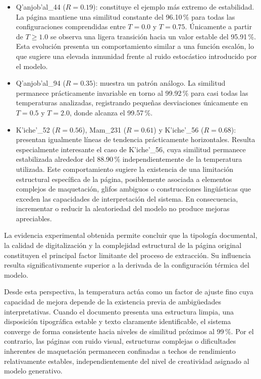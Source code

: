 \begin{itemize}
    \item Q'anjob'al\_44 (\(R = 0.19\)): constituye el ejemplo más extremo de estabilidad. La página mantiene una similitud constante del 96.10\,\% para todas las configuraciones comprendidas entre \(T=0.0\) y \(T=0.75\). Únicamente a partir de \(T \ge 1.0\) se observa una ligera transición hacia un valor estable del 95.91\,\%. Esta evolución presenta un comportamiento similar a una función escalón, lo que sugiere una elevada inmunidad frente al ruido estocástico introducido por el modelo.

    \item Q'anjob'al\_94 (\(R = 0.35\)): muestra un patrón análogo. La similitud permanece prácticamente invariable en torno al 99.92\,\% para casi todas las temperaturas analizadas, registrando pequeñas desviaciones únicamente en \(T=0.5\) y \(T=2.0\), donde alcanza el 99.57\,\%.

    \item K'iche'\_52 (\(R = 0.56\)), Mam\_231 (\(R = 0.61\)) y K'iche'\_56 (\(R = 0.68\)): presentan igualmente líneas de tendencia prácticamente horizontales. Resulta especialmente interesante el caso de K'iche'\_56, cuya similitud permanece estabilizada alrededor del 88.90\,\% independientemente de la temperatura utilizada. Este comportamiento sugiere la existencia de una limitación estructural específica de la página, posiblemente asociada a elementos complejos de maquetación, glifos ambiguos o construcciones lingüísticas que exceden las capacidades de interpretación del sistema. En consecuencia, incrementar o reducir la aleatoriedad del modelo no produce mejoras apreciables.
\end{itemize}

La evidencia experimental obtenida permite concluir que la tipología documental, la calidad de digitalización y la complejidad estructural de la página original constituyen el principal factor limitante del proceso de extracción. Su influencia resulta significativamente superior a la derivada de la configuración térmica del modelo.

Desde esta perspectiva, la temperatura actúa como un factor de ajuste fino cuya capacidad de mejora depende de la existencia previa de ambigüedades interpretativas. Cuando el documento presenta una estructura limpia, una disposición tipográfica estable y texto claramente identificable, el sistema converge de forma consistente hacia niveles de similitud próximos al 99\,\%. Por el contrario, las páginas con ruido visual, estructuras complejas o dificultades inherentes de maquetación permanecen confinadas a techos de rendimiento relativamente estables, independientemente del nivel de creatividad asignado al modelo generativo.


